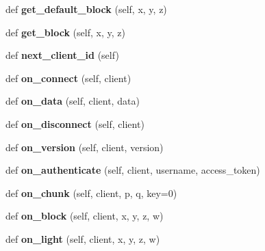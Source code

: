\begin{DoxyCompactItemize}
\mbox{\label{classserver_1_1Model_abeaec0fd82dbf66b7ca21bb464517c20}} 
def {\bfseries get\+\_\+default\+\_\+block} (self, x, y, z)
\item 
\mbox{\label{classserver_1_1Model_a3acb5e5f1b3c11a61caf47887414d0e1}} 
def {\bfseries get\+\_\+block} (self, x, y, z)
\item 
\mbox{\label{classserver_1_1Model_a3e13a7313fc94f05ecf271dd4a9664d1}} 
def {\bfseries next\+\_\+client\+\_\+id} (self)
\item 
\mbox{\label{classserver_1_1Model_a5ab44bf7f5122e3b5572079e02ff0b92}} 
def {\bfseries on\+\_\+connect} (self, client)
\item 
\mbox{\label{classserver_1_1Model_a2307c8a450ed2e43325c7d182fcf9b69}} 
def {\bfseries on\+\_\+data} (self, client, data)
\item 
\mbox{\label{classserver_1_1Model_ab461be206915068246242c80eb7d75bb}} 
def {\bfseries on\+\_\+disconnect} (self, client)
\item 
\mbox{\label{classserver_1_1Model_a7a130d4cef3951790bf3f27b9a2114c6}} 
def {\bfseries on\+\_\+version} (self, client, version)
\item 
\mbox{\label{classserver_1_1Model_a2e228fba3228beb3da42cd5506cd5606}} 
def {\bfseries on\+\_\+authenticate} (self, client, username, access\+\_\+token)
\item 
\mbox{\label{classserver_1_1Model_a210e38620f762c3ae492b8f6e4d78a3a}} 
def {\bfseries on\+\_\+chunk} (self, client, p, q, key=0)
\item 
\mbox{\label{classserver_1_1Model_a8d5d9e3cda0e8aa384b5f5f2f45cd4bd}} 
def {\bfseries on\+\_\+block} (self, client, x, y, z, w)
\item 
\mbox{\label{classserver_1_1Model_ae356a9dde121cdda833d37b96012fa98}} 
def {\bfseries on\+\_\+light} (self, client, x, y, z, w)

\end{DoxyCompactItemize}

